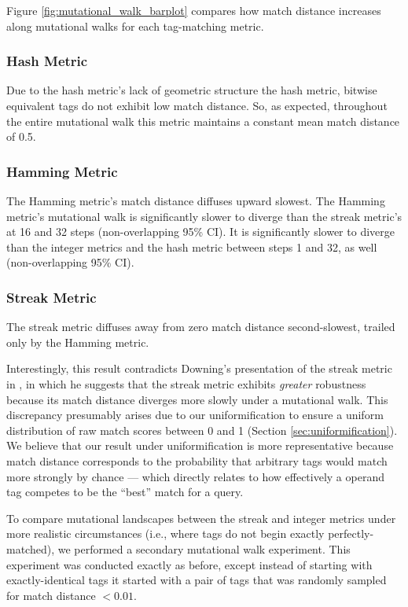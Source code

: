 Figure \ref{fig:mutational_walk_barplot} compares how match distance increases along mutational walks for each tag-matching metric.

\subsubsection{Hash Metric}

Due to the hash metric's lack of geometric structure the hash metric, bitwise equivalent tags do not exhibit low match distance.
So, as expected, throughout the entire mutational walk this metric maintains a constant mean match distance of 0.5.

\subsubsection{Hamming Metric}

The Hamming metric's match distance diffuses upward slowest.
The Hamming metric's mutational walk is significantly slower to diverge than the streak metric's at 16 and 32 steps (non-overlapping 95\% CI).
It is significantly slower to diverge than the integer metrics and the hash metric between steps 1 and 32, as well (non-overlapping 95\% CI).

\subsubsection{Streak Metric}

The streak metric diffuses away from zero match distance second-slowest, trailed only by the Hamming metric.

Interestingly, this result contradicts Downing's presentation of the streak metric in \citep{downing2015intelligence}, in which he suggests that the streak metric exhibits \textit{greater} robustness because its match distance diverges more slowly under a mutational walk.
This discrepancy presumably arises due to our uniformification to ensure a uniform distribution of raw match scores between 0 and 1 (Section \ref{sec:uniformification}).
We believe that our result under uniformification is more representative because match distance corresponds to the probability that arbitrary tags would match more strongly by chance --- which directly relates to how effectively a operand tag competes to be the ``best'' match for a query.

To compare mutational landscapes between the streak and integer metrics under more realistic circumstances (i.e., where tags do not begin exactly perfectly-matched), we performed a secondary mutational walk experiment.
This experiment was conducted exactly as before, except instead of starting with exactly-identical tags it started with a pair of tags that was randomly sampled for match distance $<0.01$.

